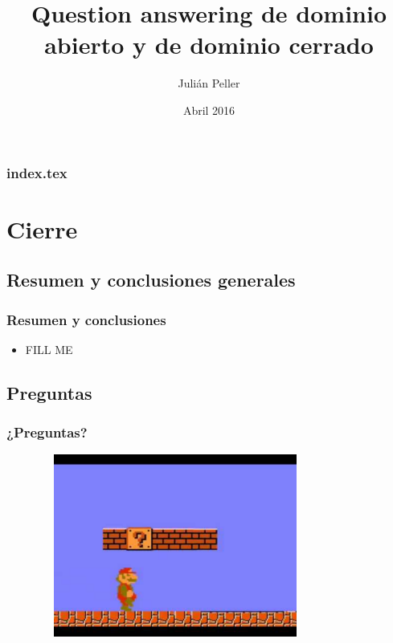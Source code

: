 \documentclass{beamer}
\title{Question answering de dominio abierto y de dominio cerrado}
\author{Julián Peller}
\date{Abril 2016} %
\begin{document}
\begin{frame}
  \titlepage
\end{frame}

\begin{frame}
  \frametitle{index.tex}
  \tableofcontents[pausesections]
\end{frame}






\section{Cierre}
  \subsection*{Resumen y conclusiones generales}
    \begin{frame}
    \frametitle{Resumen y conclusiones}
      \begin{itemize}
        \item {\color{red} FILL ME}
      \end{itemize}
    \end{frame}

  \subsection*{Preguntas}
  \begin{frame}
    \frametitle{¿Preguntas?}
      \begin{figure}
        \includegraphics[width=9cm,height=6cm]{graficos/qmark2.pdf}
      \end{figure}
    \end{frame}


\end{document}
